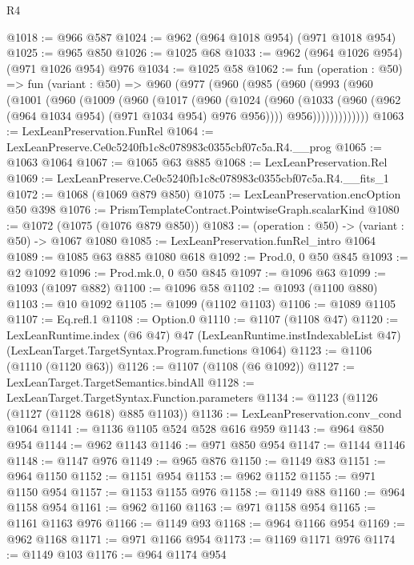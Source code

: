 \begin{lexlean}{R4}
\begin{coremodule}
@1018 := @966 @587
@1024 := @962 (@964 @1018 @954) (@971 @1018 @954)
@1025 := @965 @850
@1026 := @1025 @68
@1033 := @962 (@964 @1026 @954) (@971 @1026 @954) @976
@1034 := @1025 @58
@1062 := fun (operation : @50) =>
  fun (variant : @50) =>
  @960
    (@977
      (@960
        (@985
          (@960
            (@993
              (@960
                (@1001
                  (@960
                    (@1009
                      (@960
                        (@1017
                          (@960
                            (@1024
                              (@960
                                (@1033 (@960 (@962 (@964 @1034 @954) (@971 @1034 @954) @976 @956))))
                              @956)))))))))))))
@1063 := LexLeanPreservation.FunRel
@1064 := LexLeanPreserve.Ce0c5240fb1c8c078983c0355cbf07c5a.R4.__prog
@1065 := @1063 @1064
@1067 := @1065 @63 @885
@1068 := LexLeanPreservation.Rel
@1069 := LexLeanPreserve.Ce0c5240fb1c8c078983c0355cbf07c5a.R4.__fits_1
@1072 := @1068 (@1069 @879 @850)
@1075 := LexLeanPreservation.encOption @50 @398
@1076 := PrismTemplateContract.PointwiseGraph.scalarKind
@1080 := @1072 (@1075 (@1076 @879 @850))
@1083 := (operation : @50) -> (variant : @50) -> @1067 @1080
@1085 := LexLeanPreservation.funRel_intro @1064
@1089 := @1085 @63 @885 @1080 @618
@1092 := Prod.{0, 0} @50 @845
@1093 := @2 @1092
@1096 := Prod.mk.{0, 0} @50 @845
@1097 := @1096 @63
@1099 := @1093 (@1097 @882)
@1100 := @1096 @58
@1102 := @1093 (@1100 @880)
@1103 := @10 @1092
@1105 := @1099 (@1102 @1103)
@1106 := @1089 @1105
@1107 := Eq.refl.{1}
@1108 := Option.{0}
@1110 := @1107 (@1108 @47)
@1120 := LexLeanRuntime.index
    (@6 @47)
    @47
    (LexLeanRuntime.instIndexableList @47)
    (LexLeanTarget.TargetSyntax.Program.functions @1064)
@1123 := @1106 (@1110 (@1120 @63))
@1126 := @1107 (@1108 (@6 @1092))
@1127 := LexLeanTarget.TargetSemantics.bindAll
@1128 := LexLeanTarget.TargetSyntax.Function.parameters
@1134 := @1123 (@1126 (@1127 (@1128 @618) @885 @1103))
@1136 := LexLeanPreservation.conv_cond @1064
@1141 := @1136 @1105 @524 @528 @616 @959
@1143 := @964 @850 @954
@1144 := @962 @1143
@1146 := @971 @850 @954
@1147 := @1144 @1146
@1148 := @1147 @976
@1149 := @965 @876
@1150 := @1149 @83
@1151 := @964 @1150
@1152 := @1151 @954
@1153 := @962 @1152
@1155 := @971 @1150 @954
@1157 := @1153 @1155 @976
@1158 := @1149 @88
@1160 := @964 @1158 @954
@1161 := @962 @1160
@1163 := @971 @1158 @954
@1165 := @1161 @1163 @976
@1166 := @1149 @93
@1168 := @964 @1166 @954
@1169 := @962 @1168
@1171 := @971 @1166 @954
@1173 := @1169 @1171 @976
@1174 := @1149 @103
@1176 := @964 @1174 @954

\end{coremodule}
\end{lexlean}

